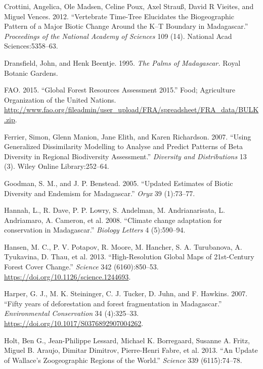\documentclass[12pt,]{article}
\begin{document}
\leavevmode\hypertarget{ref-Crottini2012}{}%
Crottini, Angelica, Ole Madsen, Celine Poux, Axel Strauß, David R
Vieites, and Miguel Vences. 2012. ``Vertebrate Time-Tree Elucidates the
Biogeographic Pattern of a Major Biotic Change Around the K--T Boundary
in Madagascar.'' \emph{Proceedings of the National Academy of Sciences}
109 (14). National Acad Sciences:5358--63.

\leavevmode\hypertarget{ref-Dransfield1995}{}%
Dransfield, John, and Henk Beentje. 1995. \emph{The Palms of
Madagascar.} Royal Botanic Gardens.

\leavevmode\hypertarget{ref-FAO2015}{}%
FAO. 2015. ``Global Forest Resources Assessment 2015.'' Food;
Agriculture Organization of the United Nations.
\url{http://www.fao.org/fileadmin/user_upload/FRA/spreadsheet/FRA_data/BULK.zip}.

\leavevmode\hypertarget{ref-Ferrier2007}{}%
Ferrier, Simon, Glenn Manion, Jane Elith, and Karen Richardson. 2007.
``Using Generalized Dissimilarity Modelling to Analyse and Predict
Patterns of Beta Diversity in Regional Biodiversity Assessment.''
\emph{Diversity and Distributions} 13 (3). Wiley Online Library:252--64.

\leavevmode\hypertarget{ref-Goodman2005}{}%
Goodman, S. M., and J. P. Benstead. 2005. ``Updated Estimates of Biotic
Diversity and Endemism for Madagascar.'' \emph{Oryx} 39 (1):73--77.

\leavevmode\hypertarget{ref-Hannah2008}{}%
Hannah, L., R. Dave, P. P. Lowry, S. Andelman, M. Andrianarisata, L.
Andriamaro, A. Cameron, et al. 2008. ``Climate change adaptation for
conservation in Madagascar.'' \emph{Biology Letters} 4 (5):590--94.

\leavevmode\hypertarget{ref-Hansen2013}{}%
Hansen, M. C., P. V. Potapov, R. Moore, M. Hancher, S. A. Turubanova, A.
Tyukavina, D. Thau, et al. 2013. ``High-Resolution Global Maps of
21st-Century Forest Cover Change.'' \emph{Science} 342 (6160):850--53.
\url{https://doi.org/10.1126/science.1244693}.

\leavevmode\hypertarget{ref-Harper2007}{}%
Harper, G. J., M. K. Steininger, C. J. Tucker, D. Juhn, and F. Hawkins.
2007. ``Fifty years of deforestation and forest fragmentation in
Madagascar.'' \emph{Environmental Conservation} 34 (4):325--33.
\url{https://doi.org/10.1017/S0376892907004262}.

\leavevmode\hypertarget{ref-Holt2013}{}%
Holt, Ben G., Jean-Philippe Lessard, Michael K. Borregaard, Susanne A.
Fritz, Miguel B. Araujo, Dimitar Dimitrov, Pierre-Henri Fabre, et al.
2013. ``An Update of Wallace's Zoogeographic Regions of the World.''
\emph{Science} 339 (6115):74--78.
\end{document}
